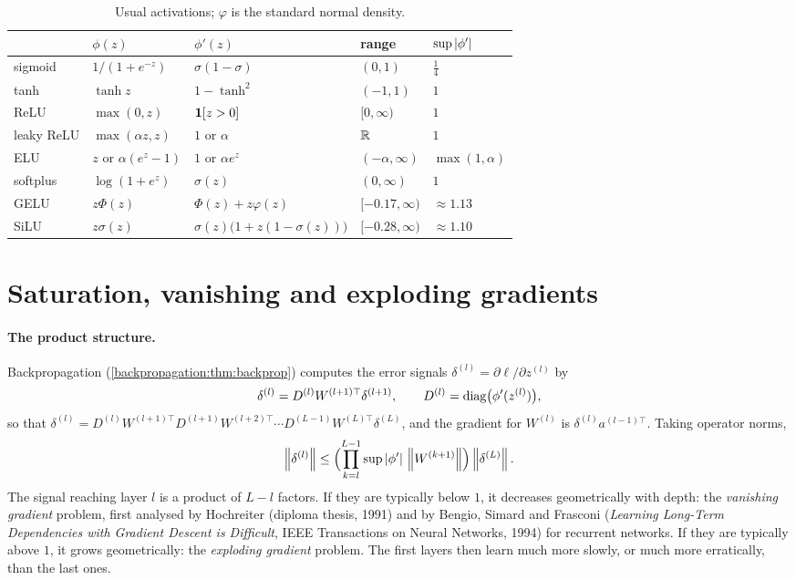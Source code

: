 \begin{notechapter}
\begin{table}[ht]
\centering\small
\begin{tabular}{lllll}
\toprule
& $\phi(z)$ & $\phi'(z)$ & range & $\sup\left|\phi'\right|$ \\
\midrule
sigmoid & $1/(1 + e^{-z})$ & $\sigma(1 - \sigma)$ & $(0,1)$ & $\frac14$ \\
tanh & $\tanh z$ & $1 - \tanh^2$ & $(-1,1)$ & $1$ \\
ReLU & $\max(0,z)$ & $\mathbf{1}[z>0]$ & $[0,\infty)$ & $1$ \\
leaky ReLU & $\max(\alpha z, z)$ & $1$ or $\alpha$ & $\mathbb{R}$ & $1$ \\
ELU & $z$ or $\alpha(e^z - 1)$ & $1$ or $\alpha e^z$ & $(-\alpha,\infty)$ & $\max(1,\alpha)$ \\
softplus & $\log(1 + e^z)$ & $\sigma(z)$ & $(0,\infty)$ & $1$ \\
GELU & $z\Phi(z)$ & $\Phi(z) + z\varphi(z)$ & $[-0.17,\infty)$ & $\approx1.13$ \\
SiLU & $z\sigma(z)$ & $\sigma(z)\bigl(1 + z(1 - \sigma(z))\bigr)$ & $[-0.28,\infty)$ & $\approx1.10$ \\
\bottomrule
\end{tabular}
\caption{Usual activations; $\varphi$ is the standard normal density.}
\label{activation-functions:tab:catalogue}
\end{table}

\section{Saturation, vanishing and exploding gradients}\label{activation-functions:sec:vanishing}

\paragraph{The product structure.} Backpropagation
(\cref{backpropagation:thm:backprop}) computes the error signals $\delta^{(l)} = \partial\ell/\partial z^{(l)}$ by
\[
  \delta^{(l)} = D^{(l)}W^{(l+1)\top}\delta^{(l+1)},\qquad D^{(l)} = \operatorname{diag}\bigl(\phi'(z^{(l)})\bigr),
\]
so that $\delta^{(l)} = D^{(l)}W^{(l+1)\top}D^{(l+1)}W^{(l+2)\top}\cdots D^{(L-1)}W^{(L)\top}\delta^{(L)}$, and the gradient for $W^{(l)}$ is
$\delta^{(l)}a^{(l-1)\top}$. Taking operator norms,
\[
  \left\|\delta^{(l)}\right\|\leq\Bigl(\prod_{k=l}^{L-1}\sup\left|\phi'\right|\,\left\|W^{(k+1)}\right\|\Bigr)\left\|\delta^{(L)}\right\| .
\]
The signal reaching layer $l$ is a product of $L - l$ factors. If they are typically below $1$,
it decreases geometrically with depth: the \emph{vanishing gradient} problem, first
analysed by Hochreiter (diploma thesis, 1991) and by Bengio, Simard and Frasconi
(\emph{Learning Long-Term Dependencies with Gradient Descent is Difficult}, IEEE Transactions
on Neural Networks, 1994) for recurrent networks. If they are typically above $1$, it grows
geometrically: the \emph{exploding gradient} problem. The first layers then learn much more
slowly, or much more erratically, than the last ones.


\end{notechapter}
